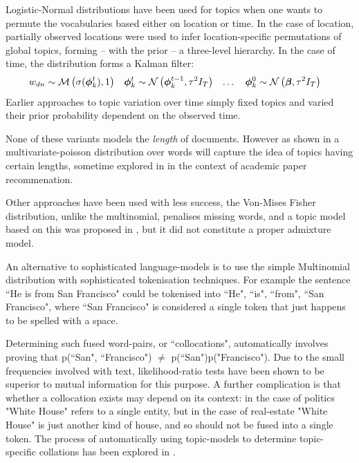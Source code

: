 Logistic-Normal distributions have been used for topics when one wants to permute the vocabularies based either on location \cite{Eisenstein2010} or time\cite{Blei2006a}. In the case of location, partially observed locations were used to infer location-specific permutations of global topics, forming -- with the prior -- a three-level hierarchy. In the case of time, the distribution forms a Kalman filter:
\begin{align}
w_{dn} & \sim \mathcal{M} \left( {\sigma(\bm \phi_k^t)},{1} \right) &
\bm \phi_k^t & \sim \mathcal{N} \left( {\bm \phi_k^{t-1}}, {\tau^2 I_T} \right) & \ldots\quad
\bm \phi_k^0 & \sim \mathcal{N} \left( {\bm \beta}, {\tau^2 I_T} \right)
\end{align}
Earlier approaches to topic variation over time simply fixed topics and varied their prior probability dependent on the observed time\cite{Wang2006}. 
 
None of these variants models the \emph{length} of documents. However as shown in  a multivariate-poisson distribution over words will capture the idea of topics having certain lengths, sometime explored in\cite{Gopalan2013} in the context of academic paper recommenation.

Other approaches have been used with less success, the Von-Mises Fisher distribution, unlike the multinomial, penalises missing words, and a topic model based on this was proposed in \cite{Reisinger2010}, but it did not constitute a proper admixture model.

An alternative to sophisticated language-models is to use the simple Multinomial distribution with sophisticated tokenisation techniques. For example the sentence ``He is from San Francisco" could be tokenised into {``He", ``is", ``from", ``San Francisco"}, where ``San Francisco" is considered a single token that just happens to be spelled with a space.

Determining such fused word-pairs, or ``collocations", automatically  involves proving that p(``San", ``Francisco") $\neq$ p(``San")p("Francisco"). Due to the small frequencies involved with text, likelihood-ratio tests have been shown to be superior to mutual information for this purpose\cite{Dunning1993}. A further complication is that whether a collocation exists may depend on its context: in the case of politics "White House" refers to a single entity, but in the case of real-estate "White House" is just another kind of house, and so should not be fused into a single token. The process of automatically using topic-models to determine topic-specific collations has been explored in \cite{Johnson2010}.


